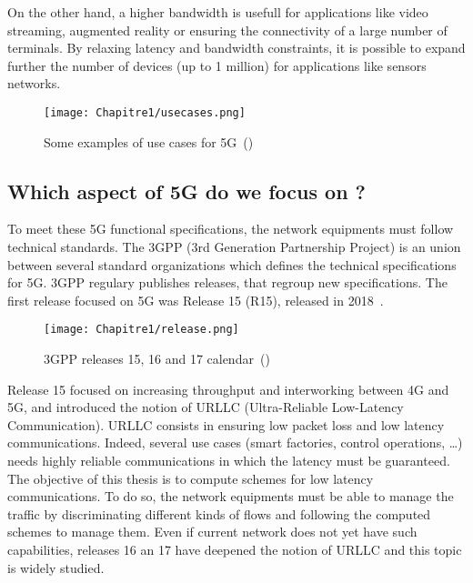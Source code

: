 On the other hand, a higher bandwidth is usefull for applications like video streaming, augmented reality or ensuring the connectivity of a large number of terminals. By relaxing latency and bandwidth constraints, it is possible to expand further the number of devices (up to 1 million) for applications like sensors networks.

  \begin{figure}[h] 
      \begin{center}
      \texttt{[image: Chapitre1/usecases.png]}
      \end{center}
      \caption{Some examples of use cases for 5G~(\cite{5GACIA})}\label{fig:usecases}
      \end{figure}



\subsection{Which aspect of 5G do we focus on ?}


To meet these 5G functional specifications, the network equipments must follow technical standards. The 3GPP (3rd Generation Partnership Project) is an union between several standard organizations which defines the technical specifications for 5G. 3GPP regulary publishes releases, that regroup new specifications. The first release focused on 5G was Release 15 (R15), released in 2018~\cite{RELEASENOKIA}.  

  \begin{figure}[h]
      \begin{center}
      \texttt{[image: Chapitre1/release.png]}
      \end{center}
      \caption{3GPP releases 15, 16 and 17 calendar~(\cite{RELEASENOKIA})}\label{fig:release}
      \end{figure}
  

Release 15 focused on increasing throughput and interworking between 4G and 5G, and introduced the notion of URLLC (Ultra-Reliable Low-Latency Communication). URLLC consists in ensuring low packet loss and low latency communications. Indeed, several use cases (smart factories, control operations, \dots) needs highly reliable communications in which the latency must be guaranteed. 
The objective of this thesis is to compute schemes for low latency communications. To do so, the network equipments must be able to manage the traffic by discriminating different kinds of flows and following the computed schemes to manage them. Even if current network does not yet have such capabilities, releases 16 an 17 have deepened the notion of URLLC and this topic is widely studied. 

